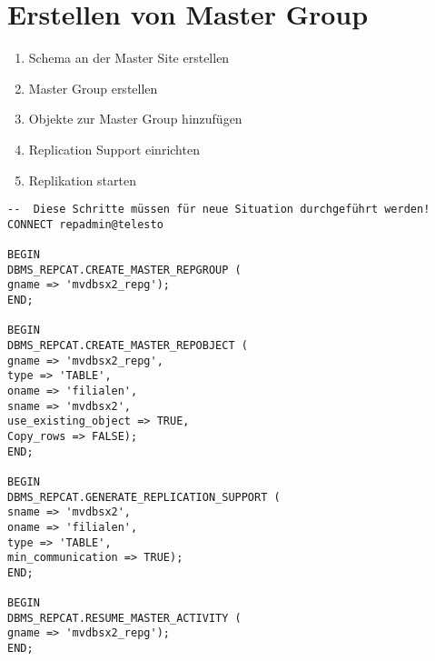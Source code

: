\documentclass[a4paper,10pt,titlepage=false]{scrreprt}
\begin{document}
\section{Erstellen von Master Group} %
\label{sec:erstellen_von_master_group}
\begin{enumerate}
  \item Schema an der Master Site erstellen
\item Master Group erstellen
\item  Objekte zur Master Group hinzufügen
\item Replication Support einrichten
\item  Replikation starten
\end{enumerate}
\begin{lstlisting}[caption=Erstellen von Master Group,style=sql]
--  Diese Schritte müssen für neue Situation durchgeführt werden!
CONNECT repadmin@telesto

BEGIN
DBMS_REPCAT.CREATE_MASTER_REPGROUP (
gname => 'mvdbsx2_repg');
END;

BEGIN
DBMS_REPCAT.CREATE_MASTER_REPOBJECT (
gname => 'mvdbsx2_repg',
type => 'TABLE',
oname => 'filialen',
sname => 'mvdbsx2',
use_existing_object => TRUE,
Copy_rows => FALSE);
END;

BEGIN
DBMS_REPCAT.GENERATE_REPLICATION_SUPPORT (
sname => 'mvdbsx2',
oname => 'filialen',
type => 'TABLE',
min_communication => TRUE);
END;

BEGIN
DBMS_REPCAT.RESUME_MASTER_ACTIVITY (
gname => 'mvdbsx2_repg');
END;

\end{lstlisting}
\end{document}
